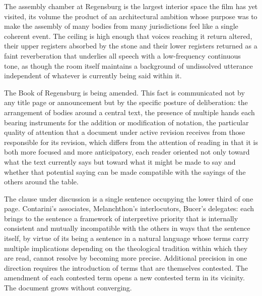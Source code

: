 \documentclass[12pt, oneside]{article}
\newenvironment{action}{%
  \vspace{0.6em}%
  \noindent\ignorespaces%
}{%
  \par\vspace{0.6em}%
}
\begin{document}
\begin{action}
The assembly chamber at Regensburg is the largest interior space the film has yet visited, its volume the product of an architectural ambition whose purpose was to make the assembly of many bodies from many jurisdictions feel like a single coherent event. The ceiling is high enough that voices reaching it return altered, their upper registers absorbed by the stone and their lower registers returned as a faint reverberation that underlies all speech with a low-frequency continuous tone, as though the room itself maintains a background of undissolved utterance independent of whatever is currently being said within it.

The Book of Regensburg is being amended. This fact is communicated not by any title page or announcement but by the specific posture of deliberation: the arrangement of bodies around a central text, the presence of multiple hands each bearing instruments for the addition or modification of notation, the particular quality of attention that a document under active revision receives from those responsible for its revision, which differs from the attention of reading in that it is both more focused and more anticipatory, each reader oriented not only toward what the text currently says but toward what it might be made to say and whether that potential saying can be made compatible with the sayings of the others around the table.

The clause under discussion is a single sentence occupying the lower third of one page. Contarini's associates, Melanchthon's interlocutors, Bucer's delegates: each brings to the sentence a framework of interpretive priority that is internally consistent and mutually incompatible with the others in ways that the sentence itself, by virtue of its being a sentence in a natural language whose terms carry multiple implications depending on the theological tradition within which they are read, cannot resolve by becoming more precise. Additional precision in one direction requires the introduction of terms that are themselves contested. The amendment of each contested term opens a new contested term in its vicinity. The document grows without converging.
\end{action}
\end{document}
